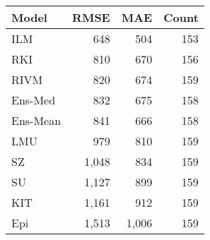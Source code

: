 \begin{tabular}{l r r r}
\toprule
Model & RMSE & MAE & Count \\
\midrule
ILM & 648 & 504 & 153 \\
RKI & 810 & 670 & 156 \\
RIVM & 820 & 674 & 159 \\
Ens-Med & 832 & 675 & 158 \\
Ens-Mean & 841 & 666 & 158 \\
LMU & 979 & 810 & 159 \\
SZ & 1,048 & 834 & 159 \\
SU & 1,127 & 899 & 159 \\
KIT & 1,161 & 912 & 159 \\
Epi & 1,513 & 1,006 & 159 \\
\bottomrule
\end{tabular}
